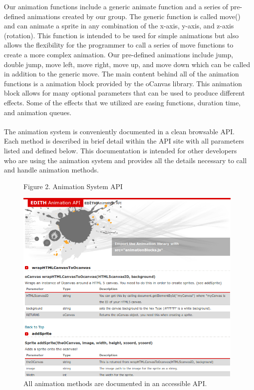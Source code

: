 \documentclass[12pt]{article}
\begin{document}
 \newpage
Our animation functions include a generic animate function and a series of pre-defined animations created by our group. The generic function is called move() and can animate a sprite in any combination of the x-axis, y-axis, and z-axis (rotation). This function is intended to be used for simple animations but also allows the flexibility for the programmer to call a series of move functions to create a more complex animation. Our pre-defined animations include jump, double jump, move left, move right, move up, and move down which can be called in addition to the generic move. The main content behind all of the animation functions is a animation block provided by the oCanvas library. This animation block allows for many optional parameters that can be used to produce different effects. Some of the effects that we utilized are easing functions, duration time, and animation queues. \\ 
\paragraph{}
The animation system is conveniently documented in a clean browsable API. Each method is described in brief detail within the API site with all parameters listed and defined below. This documentation is intended for other developers who are using the animation system and provides all the details necessary to call and handle animation methods.
\\
\begin{figure}
\caption{Figure 2. Animation System API}
  \centering
    \includegraphics[scale=.55]{api-screenshot.png}
    \caption*{All animation methods are documented in an accessible API.}
\end{figure}
\end{document}
